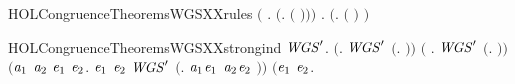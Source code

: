 \begin{SaveVerbatim}{HOLCongruenceTheoremsWGSXXrules}
   \ensuremath{(}\HOLSymConst{\HOLTokenForall{}} .   \HOLSymConst{\HOLTokenImp{}}  \ensuremath{(}\HOLTokenLambda{}.   \ensuremath{(} \ensuremath{)}\ensuremath{)}\ensuremath{)} \HOLSymConst{\HOLTokenConj{}}
   \HOLSymConst{\HOLTokenForall{}} .   \HOLSymConst{\HOLTokenImp{}}  \ensuremath{(}\HOLTokenLambda{}.  \ensuremath{(} \ensuremath{)} \ensuremath{)}
\end{SaveVerbatim}
\newcommand{\HOLCongruenceTheoremsWGSXXrules}{\UseVerbatim{HOLCongruenceTheoremsWGSXXrules}}
\begin{SaveVerbatim}{HOLCongruenceTheoremsWGSXXstrongind}
\HOLTokenTurnstile{} \HOLSymConst{\HOLTokenForall{}}\ensuremath{\HOLBoundVar{WGS}\sp{\prime}}.
       \ensuremath{(}\HOLSymConst{\HOLTokenForall{}}. \ensuremath{\HOLBoundVar{WGS}\sp{\prime}} \ensuremath{(}\HOLTokenLambda{}. \ensuremath{)}\ensuremath{)} \HOLSymConst{\HOLTokenConj{}}
       \ensuremath{(}\HOLSymConst{\HOLTokenForall{}} .   \HOLSymConst{\HOLTokenImp{}} \ensuremath{\HOLBoundVar{WGS}\sp{\prime}} \ensuremath{(}\HOLTokenLambda{}. \HOLSymConst{\ensuremath{\ldotp}} \ensuremath{)}\ensuremath{)} \HOLSymConst{\HOLTokenConj{}}
       \ensuremath{(}\HOLSymConst{\HOLTokenForall{}}\ensuremath{\HOLBoundVar{a}\sb{\mathrm{1}}} \ensuremath{\HOLBoundVar{a}\sb{\mathrm{2}}} \ensuremath{\HOLBoundVar{e}\sb{\mathrm{1}}} \ensuremath{\HOLBoundVar{e}\sb{\mathrm{2}}}.
             \ensuremath{\HOLBoundVar{e}\sb{\mathrm{1}}} \HOLSymConst{\HOLTokenConj{}}  \ensuremath{\HOLBoundVar{e}\sb{\mathrm{2}}} \HOLSymConst{\HOLTokenImp{}}
            \ensuremath{\HOLBoundVar{WGS}\sp{\prime}} \ensuremath{(}\HOLTokenLambda{}. \ensuremath{\HOLBoundVar{a}\sb{\mathrm{1}}}\HOLSymConst{\ensuremath{\ldotp}}\ensuremath{\HOLBoundVar{e}\sb{\mathrm{1}}}  \HOLSymConst{\ensuremath{+}} \ensuremath{\HOLBoundVar{a}\sb{\mathrm{2}}}\HOLSymConst{\ensuremath{\ldotp}}\ensuremath{\HOLBoundVar{e}\sb{\mathrm{2}}} \ensuremath{)}\ensuremath{)} \HOLSymConst{\HOLTokenConj{}}
       \ensuremath{(}\HOLSymConst{\HOLTokenForall{}}\ensuremath{\HOLBoundVar{e}\sb{\mathrm{1}}} \ensuremath{\HOLBoundVar{e}\sb{\mathrm{2}}}.

\end{SaveVerbatim}
